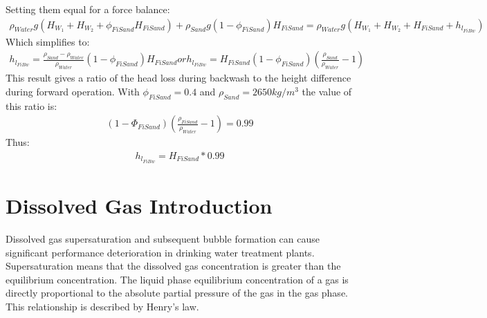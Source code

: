 \documentclass[letterpaper,10pt,english]{sphinxmanual}
\begin{document}
{Setting them equal for a force balance:
\begin{equation}\label{equation:Filtration/Filtration_Derivations:Filtration/Filtration_Derivations:2}
\begin{split}\rho_{Water} g \left( H_{W_1} + H_{W_2} + \phi_{FiSand} H_{FiSand} \right) + \rho_{Sand} g \left( 1 - \phi_{FiSand} \right) H_{FiSand} = \rho_{Water} g \left( H_{W_1} + H_{W_2} + H_{FiSand} + h_{l_{FiBw}} \right)\end{split}
\end{equation}
Which simplifies to:
\begin{equation}\label{equation:Filtration/Filtration_Derivations:Filtration/Filtration_Derivations:3}
\begin{split}h_{l_{FiBw}} = \frac{\rho_{Sand} - \rho_{Water}}{\rho_{Water}} \left( 1 - \phi_{FiSand} \right) H_{FiSand}
or
h_{l_{FiBw}} = H_{FiSand} \left( 1 - \phi_{FiSand} \right)  \left( \frac{\rho_{Sand}}{\rho_{Water}} - 1 \right)\end{split}
\end{equation}
This result gives a ratio of the head loss during backwash to the height difference during forward operation. With \(\phi_{FiSand} = 0.4\) and \(\rho_{Sand} = 2650 kg/m^3\) the value of this ratio is:
\begin{equation}\label{equation:Filtration/Filtration_Derivations:Filtration/Filtration_Derivations:4}
\begin{split}\left( 1- \Phi_{FiSand} \right) \left( \frac{\rho_{FiSand}}{\rho_{Water}} - 1 \right) = 0.99\end{split}
\end{equation}
Thus:
\begin{equation}\label{equation:Filtration/Filtration_Derivations:Filtration/Filtration_Derivations:5}
\begin{split}h_{l_{FiBw}} = H_{FiSand} * 0.99\end{split}
\end{equation}

\chapter{Dissolved Gas Introduction}
\label{\detokenize{Dissolved_Gas/DG_Intro:dissolved-gas-introduction}}\label{\detokenize{Dissolved_Gas/DG_Intro:title-dissolved-gas-introduction}}\label{\detokenize{Dissolved_Gas/DG_Intro::doc}}
Dissolved gas supersaturation and subsequent bubble formation can cause significant performance deterioration in drinking water treatment plants. Supersaturation means that the dissolved gas concentration is greater than the equilibrium concentration. The liquid phase equilibrium concentration of a gas is directly proportional to the absolute partial pressure of the gas in the gas phase. This relationship is described by Henry’s law.


}
\end{document}
